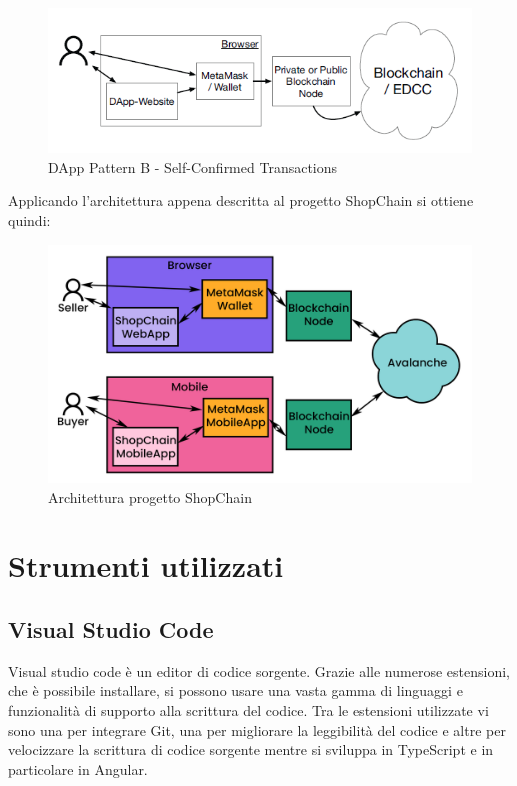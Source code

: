 \begin{figure}[!h] 
    \centering 
    \includegraphics[width=0.9\columnwidth]{immagini/ArchitetturaDApp.png}
    \caption{DApp Pattern B - Self-Confirmed Transactions}
    \label{fig:architettura-dapp}
\end{figure}

Applicando l'architettura appena descritta al progetto ShopChain si ottiene quindi:

\begin{figure}[!h] 
    \centering 
    \includegraphics[width=0.9\columnwidth]{immagini/architettura.png}
    \caption{Architettura progetto ShopChain}
\end{figure}

\section{Strumenti utilizzati}
\subsection*{Visual Studio Code}
Visual studio code è un editor di codice sorgente. Grazie alle numerose estensioni, che è possibile installare, si possono usare una vasta gamma di linguaggi e funzionalità di supporto alla scrittura del codice. Tra le estensioni utilizzate vi sono una per integrare Git, una per migliorare la leggibilità del codice e altre per velocizzare la scrittura di codice sorgente mentre si sviluppa in TypeScript e in particolare in Angular.

